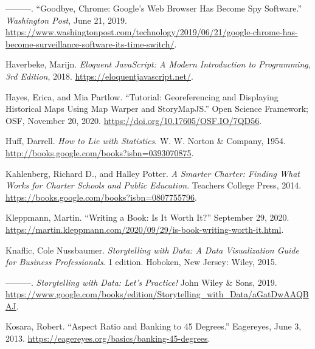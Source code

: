 \documentclass[
  english,
]{book}
\newlength{\cslhangindent}
\newlength{\cslentryspacingunit} %
\newenvironment{CSLReferences}[2] %
 {%
  \setlength{\parindent}{0pt}
  \ifodd #1
  \let\oldpar\par
  \def\par{\hangindent=\cslhangindent\oldpar}
  \fi
  \setlength{\parskip}{#2\cslentryspacingunit}
 }%
 {}
\begin{document}
\begin{CSLReferences}{1}{0}
\leavevmode{}%
---------. {``Goodbye, {Chrome}: {Google}'s {Web Browser Has Become Spy Software}.''} \emph{Washington Post}, June 21, 2019. \url{https://www.washingtonpost.com/technology/2019/06/21/google-chrome-has-become-surveillance-software-its-time-switch/}.

\leavevmode{}%
Haverbeke, Marijn. \emph{Eloquent {JavaScript}: {A Modern Introduction} to {Programming}, 3rd {Edition}}, 2018. \url{https://eloquentjavascript.net/}.

\leavevmode{}%
Hayes, Erica, and Mia Partlow. {``Tutorial: {Georeferencing} and {Displaying Historical Maps} Using {Map Warper} and {StoryMapJS}.''} {Open Science Framework}; {OSF}, November 20, 2020. \url{https://doi.org/10.17605/OSF.IO/7QD56}.

\leavevmode{}%
Huff, Darrell. \emph{How to {Lie} with {Statistics}}. {W. W. Norton \& Company}, 1954. \url{http://books.google.com/books?isbn=0393070875}.

\leavevmode{}%
Kahlenberg, Richard D., and Halley Potter. \emph{A {Smarter Charter}: {Finding What Works} for {Charter Schools} and {Public Education}}. {Teachers College Press}, 2014. \url{https://books.google.com/books?isbn=0807755796}.

\leavevmode{}%
Kleppmann, Martin. {``Writing a {Book}: {Is It Worth It}?''} September 29, 2020. \url{https://martin.kleppmann.com/2020/09/29/is-book-writing-worth-it.html}.

\leavevmode{}%
Knaflic, Cole Nussbaumer. \emph{Storytelling with {Data}: {A Data Visualization Guide} for {Business Professionals}}. 1 edition. {Hoboken, New Jersey}: {Wiley}, 2015.

\leavevmode{}%
---------. \emph{Storytelling with {Data}: {Let}'s {Practice}!} {John Wiley \& Sons}, 2019. \url{https://www.google.com/books/edition/Storytelling_with_Data/aGatDwAAQBAJ}.

\leavevmode{}%
Kosara, Robert. {``Aspect {Ratio} and {Banking} to 45 {Degrees}.''} {Eagereyes}, June 3, 2013. \url{https://eagereyes.org/basics/banking-45-degrees}.


\end{CSLReferences}
\end{document}
